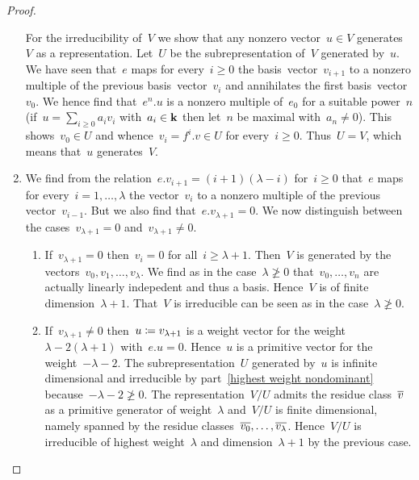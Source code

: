 \begin{proof}
\begin{enumerate}
      For the irreducibility of~$V$ we show that any nonzero vector~$u \in V$ generates~$V$ as a representation.
      Let~$U$ be the subrepresentation of~$V$ generated by~$u$.
      We have seen that~$e$ maps for every~$i \geq 0$ the basis~vector~$v_{i+1}$ to a nonzero multiple of the previous basis~vector~$v_i$ and annihilates the first basis~vector~$v_0$.
      We hence find that~$e^n.u$ is a nonzero multiple of~$e_0$ for a suitable power~$n$ (if~$u = \sum_{i \geq 0} a_i v_i$ with~$a_i \in \mathbf{k}$ then let~$n$ be maximal with~$a_n \neq 0$).
      This shows~$v_0 \in U$ and whence~$v_i = f^i.v \in U$ for every~$i \geq 0$.
      Thus~$U = V$, which means that~$u$ generates~$V$.
    \item
      We find from the relation~$e.v_{i+1} = (i+1)(\lambda-i)$ for~$i \geq 0$ that~$e$ maps for every~$i = 1, \dotsc, \lambda$ the vector~$v_i$ to a nonzero multiple of the previous vector~$v_{i-1}$.
      But we also find that~$e.v_{\lambda+1} = 0$.
      We now distinguish between the cases~$v_{\lambda+1} = 0$ and~$v_{\lambda+1} \neq 0$.
      \begin{enumerate}
        \item
          If~$v_{\lambda+1} = 0$ then~$v_i = 0$ for all~$i \geq \lambda+1$.
          Then~$V$ is generated by the vectors~$v_0, v_1, \dotsc, v_\lambda$.
          We find as in the case~$\lambda \ngeq 0$ that~$v_0, \dotsc, v_n$ are actually linearly indepedent and thus a basis.
          Hence~$V$ is of finite dimension~$\lambda+1$.
          That~$V$ is irreducible can be seen as in the case~$\lambda \ngeq 0$.
        \item
          If~$v_{\lambda+1} \neq 0$ then~$u \coloneqq v_{\lambda+1}$ is a weight vector for the weight~$\lambda-2(\lambda+1)$ with~$e.u = 0$.
          Hence~$u$ is a primitive vector for the weight~$-\lambda-2$.
          The subrepresentation~$U$ generated by~$u$ is infinite dimensional and irreducible by part~\ref*{highest weight nondominant} because~$-\lambda-2 \ngeq 0$.
          The representation~$V/U$ admits the residue class~$\overline{v}$ as a primitive generator of weight~$\lambda$ and~$V/U$ is finite dimensional, namely spanned by the residue classes~$\overline{v_0}, \dotsc, \overline{v_\lambda}$.
          Hence~$V/U$ is irreducible of highest weight~$\lambda$ and dimension~$\lambda+1$ by the previous case.
          

\end{enumerate}
\end{enumerate}
\end{proof}
